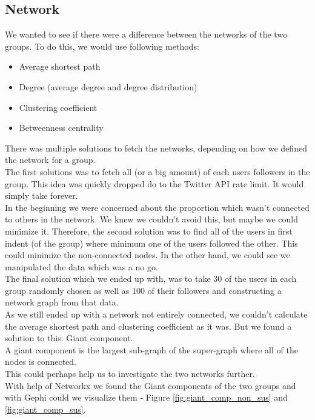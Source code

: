 \documentclass[10pt]{IEEEtran}
\begin{document}
\subsection{Network}
We wanted to see if there were a difference between the networks of the two groups. To do this, we would use following methods:\\
\begin{itemize}
  \item Average shortest path
  \item Degree (average degree and degree distribution)
  \item Clustering coefficient
  \item Betweenness centrality \\
\end{itemize}
 There was multiple solutions to fetch the networks, depending on how we defined the network for a group. \\
The first solutions was to fetch all (or a big amount) of each users followers in the group. This idea was quickly dropped do to the Twitter API rate limit. It would simply take forever. \\
In the beginning we were concerned about the proportion which wasn't connected to others in the network. We knew we couldn't avoid this, but maybe we could minimize it. Therefore, the second solution was to find all of the users in first indent (of the group) where minimum one of the users followed the other. This could minimize the non-connected nodes. In the other hand, we could see we manipulated the data which was a no go. \\
The final solution which we ended up with, was to take 30 of the users in each group randomly chosen as well as 100 of their followers and constructing a network graph from that data. \\

As we still ended up with a network not entirely connected, we couldn't calculate the average shortest path and clustering coefficient as it was. But we found a solution to this: Giant component. \\
A giant component is the largest sub-graph of the super-graph where all of the nodes is connected. \\
This could perhaps help us to investigate the two networks further. \\

With help of Networkx\cite{networkx} we found the Giant components of the two groups and with Gephi\cite{gephi} could we visualize them - Figure \ref{fig:giant_comp_non_sus} and \ref{fig:giant_comp_sus}.
\end{document}
